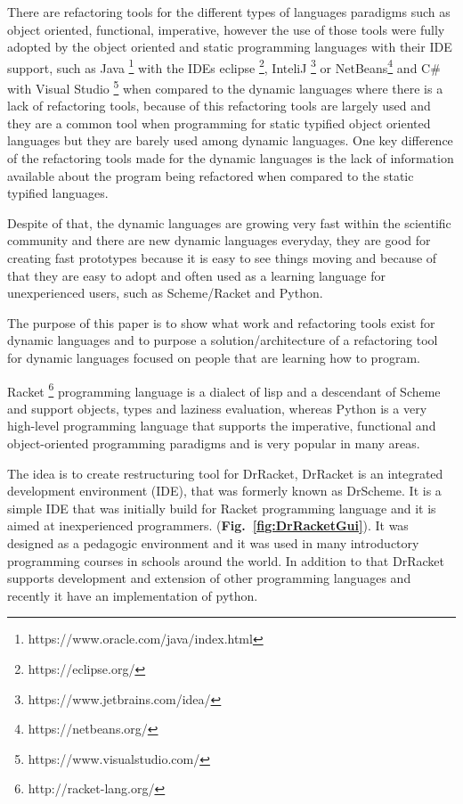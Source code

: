 There are refactoring tools for the different types of languages paradigms such as object oriented, functional, imperative, however the use of those tools were fully adopted by the object oriented and static programming languages with their IDE support, such as Java \footnote{https://www.oracle.com/java/index.html} with the IDEs eclipse \footnote{https://eclipse.org/}, InteliJ \footnote{https://www.jetbrains.com/idea/} or NetBeans\footnote{https://netbeans.org/} and C\# with Visual Studio \footnote{https://www.visualstudio.com/} when %
compared to the dynamic languages where there is a lack of refactoring tools, because of this refactoring tools are largely used and they are a common tool when programming for static typified object oriented languages but they are barely used among dynamic languages. 
One key difference of the refactoring tools made for the dynamic languages is the lack of information available about the program being refactored when compared to the static typified languages.

Despite of that, the dynamic languages are growing very fast within the scientific community and there are new dynamic languages everyday, they are good for creating fast prototypes because it is easy to see things moving and because of that they are easy to adopt and often used as a learning language for unexperienced users, such as Scheme/Racket and Python. %


The purpose of this paper is to show what work and refactoring tools exist for dynamic languages and to purpose a solution/architecture of a refactoring tool for dynamic languages focused on people that are learning how to program. %





Racket \footnote{http://racket-lang.org/} programming language is a dialect of lisp and a descendant of Scheme and support objects, types and laziness evaluation,
whereas Python is a very high-level programming language that supports the imperative, functional and object-oriented programming paradigms and is very popular in many areas.


The idea is to create restructuring tool for DrRacket, DrRacket is an integrated development environment (IDE), that was formerly known as DrScheme. It is a simple IDE that was initially build for Racket programming language and it is aimed at inexperienced programmers. ({\bf Fig.~\ref{fig:DrRacketGui}}).
It was designed as a pedagogic environment \cite{drscheme_pegadogy} and it was used in many introductory programming courses in schools around the world. In addition to that DrRacket supports development and extension of other programming languages \cite{tobin2011languages} and recently it have an implementation of python. \cite{ramos2014implementation}

